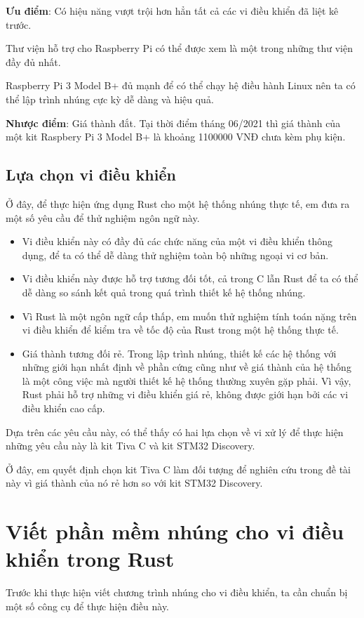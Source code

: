 \pagebreak
\textbf{Ưu điểm}: Có hiệu năng vượt trội hơn hẳn tất cả các vi điều khiển đã liệt kê trước.

Thư viện hỗ trợ cho Raspberry Pi có thể được xem là một trong những thư viện đầy đủ nhất.

Raspberry Pi 3 Model B+ đủ mạnh để có thể chạy hệ điều hành Linux nên ta có thể lập trình nhúng cực kỳ dễ dàng và hiệu quả.

\textbf{Nhược điểm}: Giá thành đắt. Tại thời điểm tháng 06/2021 thì giá thành của một kit Raspbery Pi 3 Model B+ là khoảng 1100000 VNĐ chưa kèm phụ kiện.

\subsection{Lựa chọn vi điều khiển}

Ở đây, để thực hiện ứng dụng Rust cho một hệ thống nhúng thực tế, em đưa ra một số yêu cầu để thử nghiệm ngôn ngữ này.

\begin{itemize}
    \item Vi điều khiển này có đầy đủ các chức năng của một vi điều khiển thông dụng, để ta có thể dễ dàng thử nghiệm toàn bộ những ngoại vi cơ bản.
    \item Vi điều khiển này được hỗ trợ tương đối tốt, cả trong C lẫn Rust để ta có thể dễ dàng so sánh kết quả trong quá trình thiết kế hệ thống nhúng.
    \item Vì Rust là một ngôn ngữ cấp thấp, em muốn thử nghiệm tính toán nặng trên vi điều khiển để kiểm tra về tốc độ của Rust trong một hệ thống thực tế.
    \item Giá thành tương đối rẻ.
        Trong lập trình nhúng, thiết kế các hệ thống với những giới hạn nhất định về phần cứng cũng như về giá thành của hệ thống là một công việc mà người thiết kế hệ thống thường xuyên gặp phải.
        Vì vậy, Rust phải hỗ trợ những vi điều khiển giá rẻ, không được giới hạn bởi các vi điều khiển cao cấp.
\end{itemize}

Dựa trên các yêu cầu này, có thể thấy có hai lựa chọn về vi xử lý để thực hiện những yêu cầu này là kit Tiva C và kit STM32 Discovery.

Ở đây, em quyết định chọn kit Tiva C làm đối tượng để nghiên cứu trong đề tài này vì giá thành của nó rẻ hơn so với kit STM32 Discovery.

\section{Viết phần mềm nhúng cho vi điều khiển trong Rust}
Trước khi thực hiện viết chương trình nhúng cho vi điều khiển, ta cần chuẩn bị một số công cụ để thực hiện điều này.

